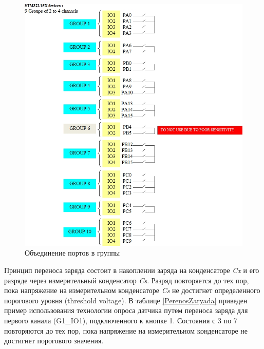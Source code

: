 \begin{figure}[H]
\begin{center}
\includegraphics[scale=0.5]{Image/56.jpg} 
\end{center}
\caption{Объединение портов в группы}\label{PortInGroup}
\end{figure}

Принцип переноса заряда состоит в накоплении заряда на конденсаторе \textit{Cx} и его разряде через измерительный конденсатор \textit{Cs}. Разряд повторяется до тех пор, пока напряжение на измерительном конденсаторе \textit{Cs} не достигнет определенного порогового уровня (threshold voltage). В таблице \ref{PerenosZaryada} приведен пример использования технологии опроса датчика путем переноса заряда для первого канала (G1\_IO1), подключенного к кнопке 1. Состояния с 3 по 7 повторяются до тех пор, пока напряжение на измерительном конденсаторе не достигнет порогового значения.


